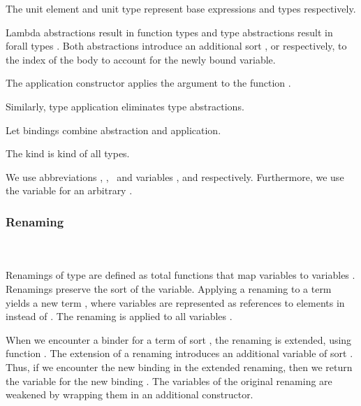 \noindent The unit element  and unit type  represent base expressions and types respectively. 

\noindent Lambda abstractions   result in function types    and type abstractions   result in forall types  . 
Both abstractions introduce an additional sort , or  respectively, to the index  of the body  to account for the newly bound variable.

\noindent The application constructor    applies the argument  to the function .

\noindent Similarly, type application    eliminates type abstractions. 

\noindent Let bindings     combine abstraction and application. 

\noindent The kind  is kind of all types.

\noindent We use abbreviations \FVar, \FExpr, \FType\ and variables ,  and  respectively. Furthermore, we use the variable  for an arbitrary   .

\subsubsection{Renaming}\hfill\\\\
Renamings  of type    are defined as total functions that map variables    to variables   . 
Renamings preserve the sort  of the variable.
\FRen
Applying a renaming    to a term    yields a new term   , where variables are represented as references to elements in  instead of .
\Fren
The renaming is applied to all variables .

\noindent When we encounter a binder for a term of sort , the renaming is extended, using function . 
\Frenext
The extension of a renaming introduces an additional variable of sort . Thus, if we encounter the new binding  in the extended renaming, then we return the variable for the new binding . The variables  of the original renaming  are weakened by wrapping them in an additional  constructor.

